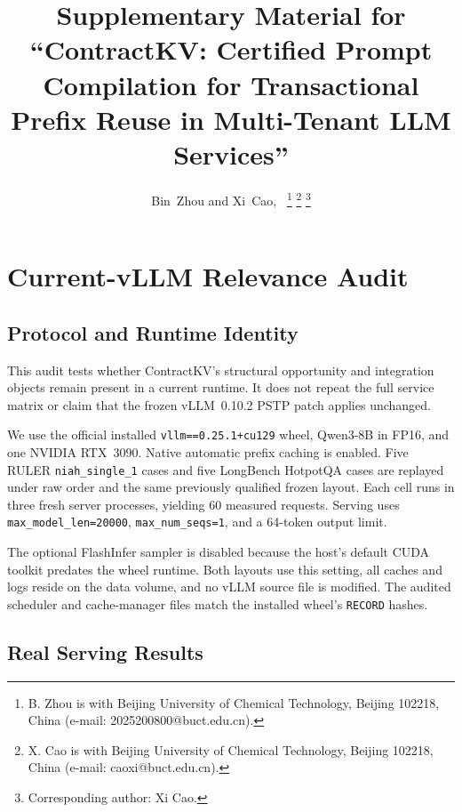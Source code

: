 \documentclass[journal]{IEEEtran}
\begin{document}
\title{Supplementary Material for ``ContractKV: Certified Prompt Compilation
for Transactional Prefix Reuse in Multi-Tenant LLM Services''}

\author{Bin~Zhou and Xi~Cao,~
\thanks{B. Zhou is with Beijing University of Chemical Technology, Beijing 102218, China (e-mail: 2025200800@buct.edu.cn).}
\thanks{X. Cao is with Beijing University of Chemical Technology, Beijing 102218, China (e-mail: caoxi@buct.edu.cn).}
\thanks{Corresponding author: Xi Cao.}
}

\maketitle

\section{Current-vLLM Relevance Audit}

\subsection{Protocol and Runtime Identity}

This audit tests whether ContractKV's structural opportunity and integration
objects remain present in a current runtime. It does not repeat the full service
matrix or claim that the frozen vLLM~0.10.2 PSTP patch applies unchanged.

We use the official installed \texttt{vllm==0.25.1+cu129} wheel, Qwen3-8B in
FP16, and one NVIDIA RTX~3090. Native automatic prefix caching is enabled. Five
RULER \texttt{niah\_single\_1} cases and five LongBench HotpotQA cases are
replayed under raw order and the same previously qualified frozen layout. Each
cell runs in three fresh server processes, yielding 60 measured requests.
Serving uses \texttt{max\_model\_len=20000},
\texttt{max\_num\_seqs=1}, and a 64-token output limit.

The optional FlashInfer sampler is disabled because the host's default CUDA
toolkit predates the wheel runtime. Both layouts use this setting, all caches
and logs reside on the data volume, and no vLLM source file is modified. The
audited scheduler and cache-manager files match the installed wheel's
\texttt{RECORD} hashes.

\subsection{Real Serving Results}
\end{document}
